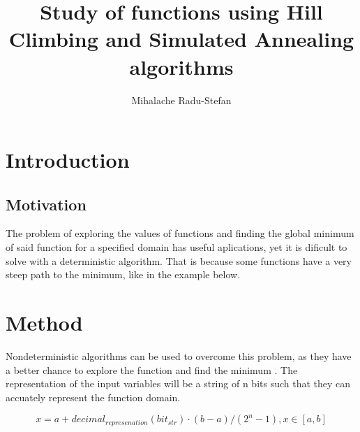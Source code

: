 \documentclass{report}
\author{Mihalache Radu-Stefan}
\title{Study of functions using Hill Climbing and Simulated Annealing algorithms}
\begin{document}
\maketitle

\section{Introduction}
\subsection{Motivation}
The problem of exploring the values of functions and finding the global minimum of said function for a specified domain has useful aplications, yet it is dificult to solve with a deterministic algorithm.
That is because some functions have a very steep path to the minimum, like in the example below.

\begin{figure}[!h]
  \centering
{}
\end{figure}

\section{Method}

Nondeterministic algorithms can be used to overcome this problem, as they have a better chance to explore the function and find the minimum . 
\newline
The representation of the input variables will be a string of n bits such that they can accuately represent the function domain.

$$x = a + decimal_{represenation}(bit_{str}) \cdot (b - a)/(2^n - 1) ,  x \in \left[a, b \right]$$
\end{document}

